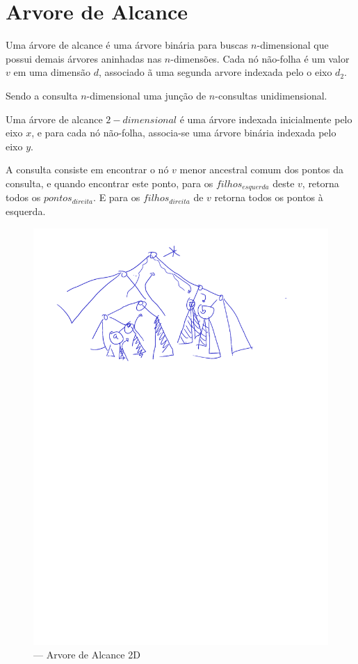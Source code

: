 \section{Arvore de Alcance}

Uma árvore de alcance é uma árvore binária para buscas $n$-dimensional que possui demais árvores aninhadas
nas $n$-dimensões.
Cada nó não-folha é um valor $v$ em uma dimensão $d$, associado ã uma segunda arvore indexada pelo o 
eixo $d_2$.

Sendo a consulta $n$-dimensional uma junção de $n$-consultas unidimensional.

Uma árvore de alcance $2-dimensional$ é uma árvore indexada inicialmente pelo eixo $x$, e para cada
nó não-folha, associa-se uma árvore binária indexada pelo eixo $y$.

A consulta consiste em encontrar o nó $v$ menor ancestral comum dos pontos da consulta, e quando encontrar este
ponto, para os $filhos_{esquerda}$ deste $v$, retorna todos os $pontos_{direita}$. E para os $filhos_{direita}$
de $v$ retorna todos os pontos à esquerda.

\begin{figure}[htb]
    \caption{\label{fig:Fig_6} — Arvore de Alcance 2D}
    \begin{center}
        \includegraphics{images/range_tree.pdf}
    \end{center}
\end{figure}

